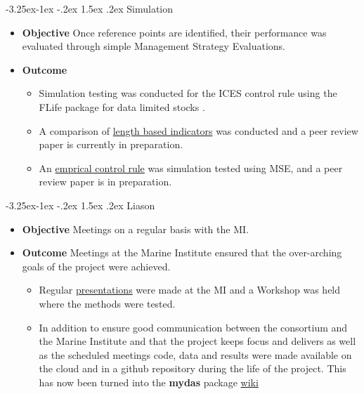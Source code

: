 \documentclass[a4paper, 10pt]{article}
\makeatletter
\renewcommand{\subsection}{\@startsection{subsection}{2}{\z@}%
 {-3.25ex\@plus -1ex \@minus -.2ex}%
 {1.5ex \@plus .2ex}%
 {\normalfont\bfseries\slshape}}
\makeatother
\begin{document}
\newpage
\subsection{Simulation}

\begin{itemize}[labelindent=\parindent,noitemsep,topsep=0pt,parsep=0pt,partopsep=0pt]
 \item \textbf{Objective} Once reference points are identified, their performance was evaluated through simple Management Strategy Evaluations.
 \item \textbf{Outcome} 
 \begin{itemize}
 \item Simulation testing was conducted for the ICES control rule using the FLife package for data limited stocks \citep{fischer2019hcr}.
 \item A comparison of \href{https://3o2y9wugzp1kfxr5hvzgzq-on.drv.tw/MyDas/papers/roc/roc.html}{length based indicators} was conducted and a peer review paper is currently in preparation.
 \item An \href{https://3o2y9wugzp1kfxr5hvzgzq-on.drv.tw/MyDas/papers/pareto/pareto.html}{emprical control rule} was simulation tested using MSE, and a peer review paper is in preparation.
  \end{itemize} 
\end{itemize}


\subsection{Liason}

\begin{itemize}[labelindent=\parindent,noitemsep,topsep=0pt,parsep=0pt,partopsep=0pt]
 \item \textbf{Objective} Meetings on a regular basis with the MI.
 \item \textbf{Outcome} 
 Meetings at the Marine Institute ensured that the over-arching goals of the project were achieved.
 \begin{itemize}
  \item  Regular \href{https://3o2y9wugzp1kfxr5hvzgzq-on.drv.tw/MyDas/presentations.html}{presentations} were made at the MI and a Workshop was held where the methods were tested.
 \item In addition to ensure good communication between the consortium and the Marine Institute and that the project keeps focus and delivers as well as the scheduled meetings code, data and results were made available on the cloud and in a github repository during the life of the project. This has now been turned into the \textbf{mydas} package \href{https://github.com/flr/mydAS/wiki}{wiki}
 \end{itemize}
\end{itemize}
\end{document}
